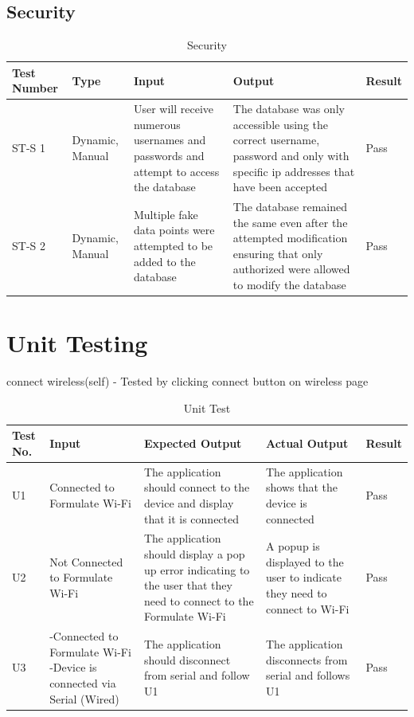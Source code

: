 \documentclass[12pt, titlepage]{article}
\begin{document}
\subsection{Security}
\begin{table}[H]
  \begin{tabular}{| p{} | p{}| p{}| p{}| p{}|}
    \hline
    \rowcolor[gray]{0.9}
    Test Number & Type & Input & Output & Result\\
    \hline
    ST-S 1 & Dynamic, Manual & User will receive numerous usernames and passwords and attempt to access the database & The database was only accessible using the correct username, password and only with specific ip addresses that have been accepted & Pass\\
    \hline
    ST-S 2 & Dynamic, Manual & Multiple fake data points were attempted to be added to the database & The database remained the same even after the attempted modification ensuring that only authorized were allowed to modify the database & Pass\\
    \hline
  \end{tabular}
  \caption{Security}
  \end{table}

\newpage
\section{Unit Testing}
connect wireless(self) - Tested by clicking connect button on wireless page
\begin{table}[H]
  \begin{tabular}{| p{} | p{}| p{}| p{}| p{}|}
    \hline
    \rowcolor[gray]{0.9}
    Test No. & Input & Expected Output & Actual Output & Result\\
    \hline
    U1 & Connected to Formulate Wi-Fi & The application should connect to the device and display that it is connected & The application shows that the device is connected & Pass \\
    \hline
    U2 & Not Connected to Formulate Wi-Fi  & The application should display a pop up error indicating to the user that they need to connect to the Formulate Wi-Fi & A popup is displayed to the user to indicate they need to connect to Wi-Fi & Pass \\
    \hline
    U3 & -Connected to Formulate Wi-Fi -Device is connected via Serial (Wired) & The application should disconnect from serial and follow U1 & The application disconnects from serial and follows U1 & Pass \\
    \hline
  \end{tabular}
  \caption{Unit Test}
  \end{table}
\end{document}
